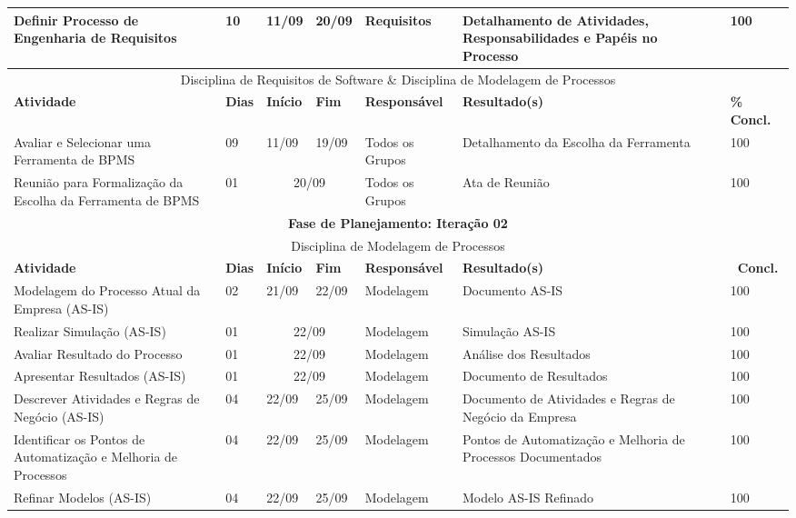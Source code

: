 \begin{center}
	\begin{tabular}{|m{6cm}|m{1cm}|m{1cm}|m{1cm}|m{4cm}|m{6cm}|m{2cm}|}
	\hline
	Definir Processo de Engenharia de Requisitos & 10 & 11/09 & 20/09 & Requisitos & Detalhamento de Atividades, Responsabilidades e Papéis no Processo & 100 \\ \hline
	\multicolumn{7}{|c|}{Disciplina de Requisitos de Software \& Disciplina de Modelagem de Processos} \\
	\hline
	\textbf{Atividade} & \textbf{Dias} & \textbf{Início} & \textbf{Fim} & \textbf{Responsável} & \textbf{Resultado(s)} & \textbf{\% Concl.} \\ \hline
	Avaliar e Selecionar uma Ferramenta de BPMS & 09 & 11/09 & 19/09 & Todos os Grupos & Detalhamento da Escolha da Ferramenta & 100 \\ \hline
	Reunião para Formalização da Escolha da Ferramenta de BPMS & 01 & \multicolumn{2}{c|}{20/09} & Todos os Grupos & Ata de Reunião & 100 \\ \hline
	\multicolumn{7}{|c|}{\textbf{Fase de Planejamento: Iteração 02}} \\
	\hline
	\multicolumn{7}{|c|}{Disciplina de Modelagem de Processos} \\
	\hline
	\textbf{Atividade} & \textbf{Dias} & \textbf{Início} & \textbf{Fim} & \textbf{Responsável} & \textbf{Resultado(s)} & \textbf{\ Concl.} \\ \hline
	Modelagem do Processo Atual da Empresa (AS-IS) & 02 & 21/09 & 22/09 & Modelagem & Documento AS-IS & 100 \\ \hline
	Realizar Simulação (AS-IS) & 01 & \multicolumn{2}{c|}{22/09} & Modelagem & Simulação AS-IS & 100 \\ \hline
	Avaliar Resultado do Processo & 01 & \multicolumn{2}{c|}{22/09} & Modelagem & Análise dos Resultados & 100 \\ \hline
	Apresentar Resultados (AS-IS) & 01 & \multicolumn{2}{c|}{22/09} & Modelagem & Documento de Resultados & 100 \\ \hline
	Descrever Atividades e Regras de Negócio (AS-IS) & 04 & 22/09 & 25/09 & Modelagem & Documento de Atividades e Regras de Negócio da Empresa & 100 \\ \hline
	Identificar os Pontos de Automatização e Melhoria de Processos & 04 & 22/09 & 25/09 & Modelagem & Pontos de Automatização e Melhoria de Processos Documentados & 100 \\ \hline
	Refinar Modelos (AS-IS) & 04 & 22/09 & 25/09 & Modelagem & Modelo AS-IS Refinado & 100 \\ \hline
	\end{tabular}
\end{center}
